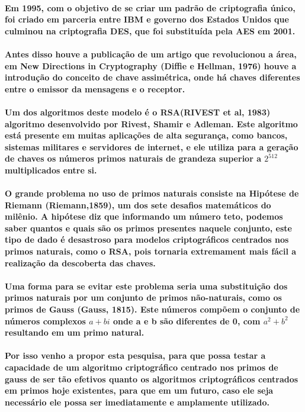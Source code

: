 \documentclass{article}
\begin{document}
	\paragraph{
		Em 1995, com o objetivo de se criar um padrão de criptografia único, foi criado em parceria entre IBM e governo dos Estados Unidos que culminou na criptografia DES, que foi substituída pela AES em 2001. 
	}
	\paragraph{
		Antes disso houve a publicação de um artigo que revolucionou a área, em New Directions in Cryptography (Diffie e Hellman, 1976) houve a introdução do conceito de chave assimétrica, onde há chaves diferentes entre o emissor da mensagens e o receptor.
	}
	\paragraph{
		Um dos algoritmos deste modelo é o RSA(RIVEST et al, 1983) algoritmo  desenvolvido por Rivest, Shamir e Adleman. Este algoritmo está presente em muitas aplicações de alta segurança, como bancos, sistemas militares e servidores de internet, e ele utiliza para a geração de chaves os números primos naturais de grandeza superior a $2^{512}$ multiplicados entre si.
	}
	\paragraph{
		O grande problema no uso de primos naturais consiste na Hipótese de Riemann (Riemann,1859), um dos sete desafios matemáticos do milênio. A hipótese diz que informando um número teto, podemos saber quantos e quais são os primos presentes naquele conjunto, este tipo de dado é desastroso para modelos criptográficos centrados nos primos naturais, como o RSA, pois tornaria extremament mais fácil a realização da descoberta das chaves.
	}
	\paragraph{
		Uma forma para se evitar este problema seria uma substituição dos primos naturais por um conjunto de primos não-naturais, como os primos de Gauss (Gauss, 1815). Este números compõem o conjunto de números complexos $a+bi$ onde a e b são diferentes de 0, com $a^2+b^2$ resultando em um primo natural.
	}
	\paragraph{
		Por isso venho a propor esta pesquisa, para que possa testar a capacidade de um algoritmo criptográfico centrado nos primos de gauss de ser tão efetivos quanto os algoritmos criptográficos centrados em primos hoje existentes, para que em um futuro, caso ele seja necessário ele possa ser imediatamente e amplamente utilizado.
	}
\end{document}
